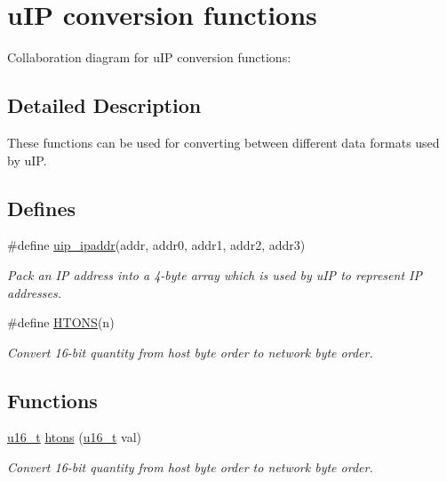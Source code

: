 \hypertarget{a00065}{
\section{u\-IP conversion functions}
\label{a00065}
}


Collaboration diagram for u\-IP conversion functions:

\subsection{Detailed Description}
These functions can be used for converting between different data formats used by u\-IP. 



\subsection*{Defines}
\begin{CompactItemize}
\item 
\#define \hyperlink{a00065_g87f0b54ade0d159fba495089128a4932}{uip\_\-ipaddr}(addr, addr0, addr1, addr2, addr3)
\begin{CompactList}\small\item\em Pack an IP address into a 4-byte array which is used by u\-IP to represent IP addresses. \item\end{CompactList}\item 
\#define \hyperlink{a00065_g69a7a4951ff21b302267532c21ee78fc}{HTONS}(n)
\begin{CompactList}\small\item\em Convert 16-bit quantity from host byte order to network byte order. \item\end{CompactList}\end{CompactItemize}
\subsection*{Functions}
\begin{CompactItemize}
\item 
\hyperlink{a00070_gfc6499c1f28697aa3bfc2804d496fd11}{u16\_\-t} \hyperlink{a00065_ga22b04cac8cf283ca12f028578bebc06}{htons} (\hyperlink{a00070_gfc6499c1f28697aa3bfc2804d496fd11}{u16\_\-t} val)
\begin{CompactList}\small\item\em Convert 16-bit quantity from host byte order to network byte order. \item\end{CompactList}\end{CompactItemize}


